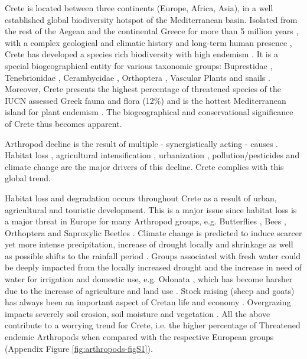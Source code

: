Crete is located between three continents (Europe, Africa, Asia), in a
well established global biodiversity hotspot \parencite{myers2000biodiversity} of the
Mediterranean basin. Isolated from the rest of the Aegean and the continental
Greece for more than 5 million years \parencite{fassoulas2018}, with a complex geological
and climatic history and long-term human presence \parencite{rackham1996the-making},
Crete has developed a species rich biodiversity with high endemism
\parencite{chatzaki2015,medail1997hot-spots,sfendourakis2018,vardinoyannis2018land}.
It is a special biogeographical entity for various taxonomic groups: Buprestidae \parencite{muhle2000catalogus},
Tenebrionidae \parencite{fattorini2006spatial,fattorini2008ecology}, Cerambycidae \parencite{vitali2017ecological},
Orthoptera \parencite{willemse2023a-review}, Vascular Plants \parencite{kougioumoutzis2017network}
and snails \parencite{vardinoyannis2018land}. Moreover, Crete presents the highest
percentage of threatened species of the IUCN assessed Greek fauna and flora
(12\%) \parencite{spiliopoulou2021the-natura} and is the hottest Mediterranean island for
plant endemism \parencite{medail2017the-specific}. The biogeographical and conservational
significance of Crete thus becomes apparent.

Arthropod decline is the result of multiple - synergistically acting - causes \parencite{cardoso2020scientists,wagner2020insect,wagner2021insect}.
Habitat loss \parencite{cardoso2020scientists,wagner2020insect,wagner2021insect},
agricultural intensification \parencite{habel2019agricultural,raven2021agricultural},
urbanization \parencite{wagner2021insect}, pollution/pesticides \parencite{bruhl2019biodiversity,cardoso2020scientists}
and climate change \parencite{cardoso2020scientists,harvey2023scientists} are the major
drivers of this decline. Crete complies with this global trend.

Habitat loss and degradation occurs throughout Crete as a result of urban,
agricultural and touristic development. This is a major issue since habitat
loss is a major threat in Europe for many Arthropod groups,
e.g. Butterflies \parencite{VanSwaaycommission2010european}, Bees \parencite{nieto2014},
Orthoptera \parencite{hochkirch2016} and Saproxylic Beetles \parencite{Calix_2018}.
Climate change is predicted to induce scarcer yet more intense precipitation,
increase of drought locally \parencite{koutroulis2011spatiotemporal} and shrinkage as well as
possible shifts to the rainfall period \parencite{koutroulis2013impact}. Groups
associated with fresh water could be deeply impacted from the locally increased
drought and the increase in need of water for irrigation and domestic use,
e.g. Odonata \parencite{kalkman2010}, which has become harsher due to the
increase of agriculture and land use \parencite{tzanakakis2020challenges}. Stock raising
(sheep and goats) has always been an important aspect of Cretan life and
economy \parencite{rackham1996the-making}. Overgrazing impacts severely soil erosion,
soil moisture and vegetation \parencite{kosmas2015exploring,orestis2015exploring}. All the
above contribute to a worrying trend for Crete, i.e. the higher percentage of
Threatened endemic Arthropods when compared with the respective European
groups (Appendix Figure \ref{fig:arthropods-figS1}).

